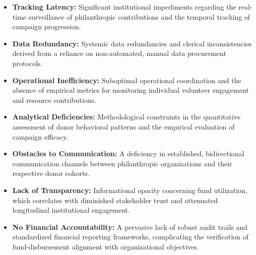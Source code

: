 \begin{itemize} \item \textbf{Tracking Latency:} Significant institutional impediments regarding the real-time surveillance of philanthropic contributions and the temporal tracking of campaign progression. \end{itemize}

\begin{itemize} \item \textbf{Data Redundancy:} Systemic data redundancies and clerical inconsistencies derived from a reliance on non-automated, manual data procurement protocols. \end{itemize}

\begin{itemize} \item \textbf{Operational Inefficiency:} Suboptimal operational coordination and the absence of empirical metrics for monitoring individual volunteer engagement and resource contributions. \end{itemize}

\begin{itemize} \item \textbf{Analytical Deficiencies:} Methodological constraints in the quantitative assessment of donor behavioral patterns and the empirical evaluation of campaign efficacy. \end{itemize}

\begin{itemize} \item \textbf{Obstacles to Communication:} A deficiency in established, bidirectional communication channels between philanthropic organizations and their respective donor cohorts. \end{itemize}

\begin{itemize} \item \textbf{Lack of Transparency:} Informational opacity concerning fund utilization, which correlates with diminished stakeholder trust and attenuated longitudinal institutional engagement. \end{itemize}

\begin{itemize} \item \textbf{No Financial Accountability:} A pervasive lack of robust audit trails and standardized financial reporting frameworks, complicating the verification of fund-disbursement alignment with organizational objectives. \end{itemize}

